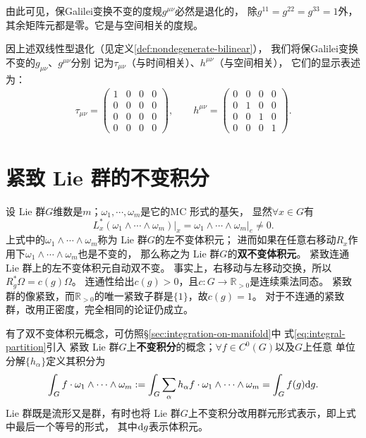 由此可见，保Galilei变换不变的度规$g^{\mu\nu}$必然是退化的，
除$g^{11}=g^{22}=g^{33}=1$外，其余矩阵元都是零。它是与空间相关的度规。

因上述双线性型退化（见定义\ref{def:nondegenerate-bilinear}），
我们将保Galilei变换不变的$g_{\mu\nu}$、$g^{\mu\nu}$分别
记为$\tau_{\mu\nu}$（与时间相关）、$h^{\mu\nu}$（与空间相关），
它们的显示表述为：
\begin{align}
\tau_{\mu \nu}=\left(\begin{array}{cccc}
	1 & 0 & 0 & 0 \\
	0 & 0 & 0 & 0 \\
	0 & 0 & 0 & 0 \\
	0 & 0 & 0 & 0
\end{array}\right), \qquad
h^{\mu \nu}=\left(\begin{array}{cccc}
	0 & 0 & 0 & 0 \\
	0 & 1 & 0 & 0 \\
	0 & 0 & 1 & 0 \\
	0 & 0 & 0 & 1
\end{array}\right) .
\end{align}

\section{紧致 Lie 群的不变积分}\label{chlg:sec_Integral}

设 Lie 群$G$维数是$m$；$\omega_1,\cdots,\omega_m$是它的MC 形式的基矢，
显然$\forall x\in G$有
\begin{equation}
    L_x^* (\omega_1 \wedge\cdots\wedge\omega_m)|_{x} = \left.\omega_1 \wedge\cdots\wedge\omega_m\right|_{e}
    \neq 0.
\end{equation}
上式中的$\omega_1 \wedge\cdots\wedge\omega_m$称为 Lie 群$G$的左不变体积元；
进而如果在任意右移动$R_x$作用下$\omega_1 \wedge\cdots\wedge\omega_m$也是不变的，
那么称之为 Lie 群$G$的\textbf{双不变体积元}。
紧致连通 Lie 群上的左不变体积元自动双不变。
事实上，右移动与左移动交换，所以$R_g^*\Omega=c(g)\Omega$。
连通性给出$c(g)>0$，且$c:G\to\mathbb R_{>0}$是连续乘法同态。
紧致群的像紧致，而$\mathbb R_{>0}$的唯一紧致子群是$\{1\}$，故$c(g)=1$。
对于不连通的紧致群，改用正密度，完全相同的论证仍成立。

有了双不变体积元概念，可仿照\S\ref{sec:integration-on-manifold}中
式\eqref{eq:integral-partition}引入
紧致 Lie 群$G$上\textbf{不变积分}的概念；$\forall f\in C^0(G)$以及$G$上任意
单位分解$\{h_\alpha\}$定义其积分为
\begin{equation}
    \int_{G} f \cdot \omega_1 \wedge\cdots\wedge\omega_m :=
    \int_{G} \sum_{\alpha}  h_\alpha f \cdot  \omega_1 \wedge\cdots\wedge\omega_m
    =\int_{G} f(g) \dd g .
\end{equation}
 Lie 群既是流形又是群，有时也将 Lie 群$G$上不变积分改用群元形式表示，即上式中最后一个等号的形式，
其中$\dd g$表示体积元。

